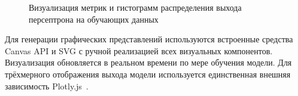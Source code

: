 \begin{figure}[ht]
    \caption{Визуализация метрик и гистограмм распределения выхода персептрона на обучающих данных}
    \label{fig:vis_metrics_hist}
\end{figure}

Для генерации графических представлений используются встроенные средства Canvas API и SVG с ручной реализацией всех визуальных компонентов. Визуализация обновляется в реальном времени по мере обучения модели. Для трёхмерного отображения выхода модели используется единственная внешняя зависимость Plotly.js~\cite{sievert2021package}.

